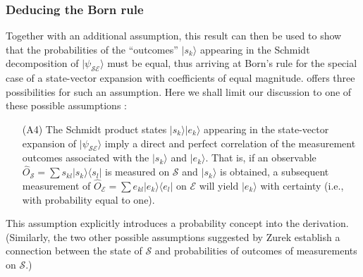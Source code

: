 \documentclass[rmp,aps,amsmath,amsfonts,noshowkeys,noshowpacs,12pt]{revtex4}
\newcommand{\ket}[1]{\ensuremath{|{#1\rangle}}}
\newcommand{\ketbra}[2]{\ensuremath{|{#1 \rangle}{\langle #2}|}}
\begin{document}
\subsubsection{Deducing the Born rule}

Together with an additional assumption, this result can then be used
to show that the probabilities of the ``outcomes'' $\ket{s_k}$
appearing in the Schmidt decomposition of $\ket{\psi_\mathcal{SE}}$
must be equal, thus arriving at Born's rule for the special case of a
state-vector expansion with coefficients of equal magnitude.
\citet{Zurek:2004:yb} offers three possibilities for such an
assumption. Here we shall limit our discussion to one of these
possible assumptions \citep[see also the comments in][]{Schlosshauer:2003:ms}:

\begin{enumerate} 

\item[(A4)] The Schmidt product states $\ket{s_k}\ket{e_k}$ appearing
  in the state-vector expansion of $\ket{\psi_\mathcal{SE}}$ imply a
  direct and perfect correlation of the measurement outcomes
  associated with the $\ket{s_k}$ and $\ket{e_k}$.  That is, if an
  observable $\widehat{O}_\mathcal{S} = \sum s_{kl} \ketbra{s_k}{s_l}$
  is measured on $\mathcal{S}$ and $\ket{s_k}$ is obtained, a
  subsequent measurement of $\widehat{O}_\mathcal{E} = \sum e_{kl}
  \ketbra{e_k}{e_l}$ on $\mathcal{E}$ will yield $\ket{e_k}$ with
  certainty (i.e., with probability equal to one).

\end{enumerate}

This assumption explicitly introduces a probability concept into the
derivation. (Similarly, the two other possible assumptions suggested
by Zurek establish a connection between the state of $\mathcal{S}$ and
probabilities of outcomes of measurements on $\mathcal{S}$.)
\end{document}
